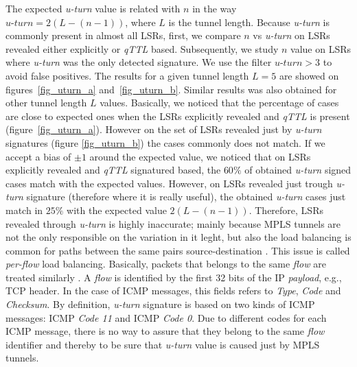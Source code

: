 The expected \textit{u-turn} value is related with $n$ in the way $\textit{u-turn}=2(L-(n-1))$, where $L$ is the tunnel length. 
Because \textit{u-turn} is commonly present in almost all LSRs, first, we compare $n$ vs \textit{u-turn} on LSRs  revealed either explicitly or \textit{qTTL} based.
Subsequently, we study $n$ value on LSRs where \textit{u-turn} was the only detected signature. 
We use the filter $\textit{u-turn}>3$ to avoid false positives. The results for a given tunnel length $L=5$ are showed on figures~\ref{fig_uturn_a} and~\ref{fig_uturn_b}. 
Similar results was also obtained for other tunnel length $L$ values. 
Basically, we noticed that the percentage of cases are close to expected ones when the LSRs explicitly revealed  and \textit{qTTL} is present (figure~\ref{fig_uturn_a}). 
However on the set of  LSRs revealed just by \textit{u-turn} signatures (figure \ref{fig_uturn_b}) the cases commonly  does not match. If we accept a bias of $ \pm 1$ around the expected value, we noticed that  on LSRs explicitly revealed  and \textit{qTTL} signatured based, the $60\%$ of obtained \textit{u-turn} signed cases match with the expected values. 
However, on LSRs revealed just trough \textit{u-turn} signature (therefore where it is really useful), the obtained \textit{u-turn} cases just match in $25\%$ with the expected value $2(L-(n-1))$. 
Therefore, LSRs revealed through \textit{u-turn} is highly inaccurate; %
mainly because MPLS tunnels are not the only responsible on the variation in it leght, but also%
the load balancing is common for paths between the same pairs source-destination \cite{BRICE07}. 
This issue is called \textit{per-flow} load balancing. 
Basically, packets that belongs to the same \textit{flow} are treated similarly \cite{BRICE06}. 
A \textit{flow} is identified by the first 32 bits of the IP \textit{payload}, e.g., TCP header. 
In the case of ICMP messages, this fields refers to \textit{Type}, \textit{Code} and \textit{Checksum}. 
By definition, \textit{u-turn} signature is based on two kinds of ICMP messages: ICMP \echoreply \textit{Code 11} and ICMP \ttlexceeded \textit{Code 0}. 
Due to different codes for each ICMP message, there is no way to assure that they belong to the same \textit{flow} identifier and thereby to be sure that \textit{u-turn} value is caused just by MPLS tunnels.
